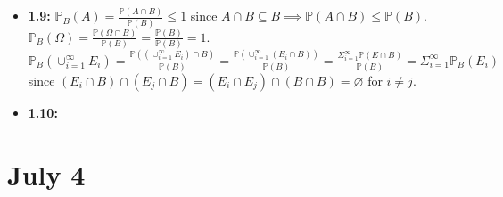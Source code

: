 \documentclass[12pt]{article}
\newcommand{\p}{\mathbb{P}}
\begin{document}
\begin{itemize}
    \item \textbf{1.9:} $\p_B(A) = \frac{\p(A \cap B)}{\p(B)} \leq 1$ since $A \cap B \subseteq B \implies \p(A \cap B) \leq \p(B)$. $\p_B(\Omega) = \frac{\p(\Omega \cap B)}{\p(B)} = \frac{\p(B)}{\p(B)} = 1$. $\p_B(\cup_{i=1}^\infty E_i) = \frac{\p((\cup_{i=1}^\infty E_i) \cap B)}{\p(B)} = \frac{\p(\cup_{i=1}^\infty (E_i \cap B))}{\p(B)} = \frac{\Sigma_{i=1}^\infty \p(E \cap B)}{\p(B)} = \Sigma_{i=1}^\infty \p_B(E_i)$ since $(E_i \cap B) \cap (E_j \cap B) = (E_i \cap E_j) \cap (B \cap B) = \varnothing$ for $i \neq j$.
    \item \textbf{1.10:}
\end{itemize}

\section*{July 4}
\end{document}
